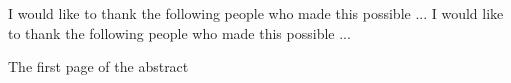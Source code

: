 \documentclass[12 pt]{report}
\begin{document}
\noindent I would like to thank the following people who made this possible ...
I would like to thank the following people who made this possible ...


\tableofcontents

\listoftables

\listoffigures


\acknowledgementspage

\abstractpage

The first page of the abstract

%
%
%
%
\startofchapters


%
%
%

\appendix
\appendixeqnumbering









\end{document}
